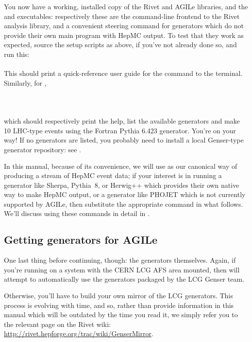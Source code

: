 You now have a working, installed copy of the Rivet and AGILe libraries, and the
 and  executables: respectively these are the
command-line frontend to the Rivet analysis library, and a convenient steering
command for generators which do not provide their own main program with HepMC
output. To test that they work as expected, source the setup scripts as above,
if you've not already done so, and run this:\\
\\
%
This should print a quick-reference user guide for the  command to
the terminal. Similarly, for ,\\
\\
\\
\\
which should respectively print the help, list the available generators and make
10 LHC-type events using the Fortran Pythia\cite{Sjostrand:2006za} 6.423 generator. You're on your
way! If no generators are listed, you probably need to install a local
Genser-type generator repository: see .

In this manual, because of its convenience, we will use  as our
canonical way of producing a stream of HepMC event data; if your interest is in
running a generator like Sherpa\cite{Gleisberg:2008ta},
Pythia~8\cite{Sjostrand:2007gs,Sjostrand:2008vc}, or Herwig++\cite{Bahr:2008pv}
which provides their own native way to make HepMC output, or a generator like
PHOJET which is not currently supported by AGILe, then substitute the
appropriate command in what follows.  We'll discuss using these commands in
detail in .


\subsection{Getting generators for AGILe}
\label{sec:genser}

One last thing before continuing, though: the generators themselves. Again, if
you're running on a system with the CERN LCG AFS area mounted, then
 will attempt to automatically use the generators packaged by the
LCG Genser team.

Otherwise, you'll have to build your own mirror of the LCG generators. This
process is evolving with time, and so, rather than provide information in this
manual which will be outdated by the time you read it, we simply refer you to
the relevant page on the Rivet wiki:
\url{http://rivet.hepforge.org/trac/wiki/GenserMirror}.

